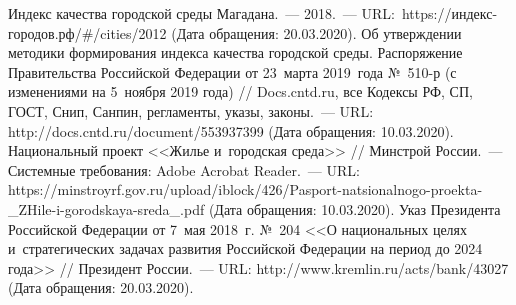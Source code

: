 \begin{thebibliography}{99}
\bibitem{}Индекс качества городской среды Магадана.~--- 2018.~--- URL:~https://индекс-городов.рф/\#/cities/2012 (Дата обращения: 20.03.2020).
\bibitem{}Об утверждении методики формирования индекса качества городской среды. Распоряжение Правительства Российской Федерации от 23~марта 2019~года №~510-р (с изменениями на 5~ноября 2019 года) // Docs.cntd.ru, все Кодексы РФ, СП, ГОСТ, Снип, Санпин, регламенты, указы, законы.~--- URL: http://docs.cntd.ru/document/553937399 (Дата обращения: 10.03.2020).
\bibitem{}Национальный проект <<Жилье и~городская среда>> // Минстрой России.~--- Системные требования: Adobe Acrobat Reader.~--- URL: https://minstroyrf.gov.ru/upload/iblock/426/Pasport-natsionalnogo-proekta-\_ZHile-i-gorodskaya-sreda\_.pdf (Дата обращения: 10.03.2020).
\bibitem{}Указ Президента Российской Федерации от 7~мая 2018~г. №~204 <<О национальных целях и~стратегических задачах развития Российской Федерации на период до 2024 года>> // Президент России.~--- URL: http://www.kremlin.ru/acts/bank/43027 (Дата обращения: 20.03.2020).

\end{thebibliography}
